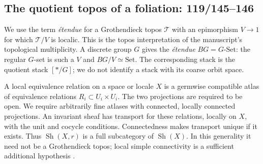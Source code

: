 \subsection{The quotient topos of a foliation: 119/145--146}

We use the term \emph{\'etendue} for a Grothendieck topos $\mathcal T$
with an epimorphism $V\to1$ for which $\mathcal T/V$ is localic.
This is the topos interpretation of the manuscript's topological
multiplicity. A discrete group $G$ gives the \emph{\'etendue} $BG=G\text{-}\mathrm{Set}$:
the regular $G$-set is such a $V$ and $BG/V\simeq\mathrm{Set}$.
The corresponding stack is the quotient stack $[*/G]$;
we do not identify a stack with its coarse orbit space.

A local equivalence relation on a space or locale $X$ is a germwise
compatible atlas of equivalence relations $R_i\subset U_i\times U_i$.
The two projections are required to be open. We require arbitrarily
fine atlases with connected, locally connected projections. An invariant
sheaf has transport for these relations, locally on $X$, with the unit
and cocycle conditions. Connectedness makes transport unique if it
exists. Thus $\operatorname{Sh}(X,r)$ is a full subcategory of
$\operatorname{Sh}(X)$. In this generality it need not be a Grothendieck
topos; local simple connectivity is a sufficient additional hypothesis
\cite[Example 2.3; Theorem 5.3]{KockMoerdijk1992}.

